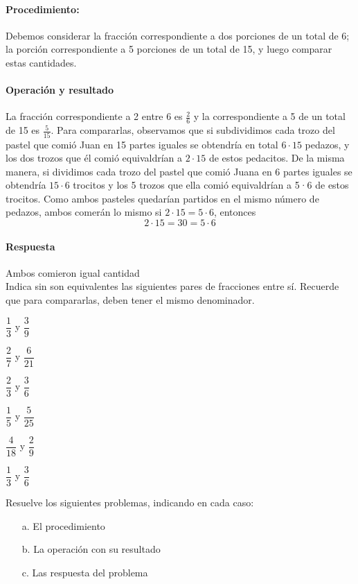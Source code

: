 \documentclass[10pt,twoside]{article}
\begin{document}
\paragraph*{Procedimiento:} Debemos considerar la fracción correspondiente a dos porciones de un total de 6; la porción correspondiente a 5 porciones de un total de 15, y luego comparar estas cantidades.
\paragraph*{Operación y resultado}
La fracción correspondiente a 2 entre 6 es $\frac{2}{6}$ y la correspondiente a 5 de un total de 15 es $\frac{5}{15}$. Para compararlas, observamos que si subdividimos cada trozo
del pastel que comió Juan en 15 partes iguales se obtendría en total $6\cdot 15$ pedazos, y los dos trozos que él comió
equivaldrían a $2\cdot 15$ de estos pedacitos. De la misma
manera, si dividimos cada trozo del pastel que comió Juana en 6 partes iguales se obtendría $15\cdot 6$ trocitos y los 5 trozos que ella comió equivaldrían a 5·6 de estos
trocitos. Como ambos pasteles quedarían partidos en el
mismo número de pedazos, ambos comerán lo mismo si $2\cdot 15 = 5\cdot 6$, entonces \[2\cdot 15=30= 5\cdot6\]
\paragraph*{Respuesta}
Ambos comieron igual cantidad\\
Indica sin son equivalentes las siguientes pares de fracciones entre sí. Recuerde que para compararlas, deben tener el mismo denominador.
\begin{itemize}
\begin{multicols}{3}
\item $\dfrac{1}{3}$ y $\dfrac{3}{9}$
\item $\dfrac{2}{7}$ y $\dfrac{6}{21}$
\item $\dfrac{2}{3}$ y $\dfrac{3}{6}$
\item $\dfrac{1}{5}$ y $\dfrac{5}{25}$
\item $\dfrac{4}{18}$ y $\dfrac{2}{9}$
\item $\dfrac{1}{3}$ y $\dfrac{3}{6}$
\end{multicols}
\end{itemize}
Resuelve los siguientes problemas, indicando en cada caso:
\begin{enumerate}
\item[a.] El procedimiento
\item[b.] La operación con su resultado
\item[c.] Las respuesta del problema
\end{enumerate}
\end{document}
